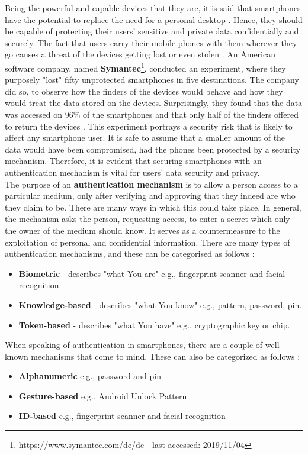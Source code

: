 Being the powerful and capable devices that they are, it is said that smartphones have the potential to replace the need for a personal desktop \cite{Alsaleh}. Hence, they should be capable of protecting their users' sensitive and private data confidentially and securely. The fact that users carry their mobile phones with them wherever they go causes a threat of the devices getting lost or even stolen \cite{Egelman:2014:YRL:2660267.2660273}. An American software company, named \textbf{Symantec}\footnote{https://www.symantec.com/de/de - last accessed: 2019/11/04}, conducted an experiment, where they purposely "lost" fifty unprotected smartphones in five destinations. The company did so, to observe how the finders of the devices would behave and how they would treat the data stored on the devices. Surprisingly, they found that the data was accessed on 96\% of the smartphones and that only half of the finders offered to return the devices \cite{symantec}.  This experiment portrays a security risk that is likely to affect any smartphone user.  It is safe to assume that a smaller amount of the data would have been compromised, had the phones been protected by a security mechanism. Therefore, it is evident that securing smartphones with an authentication mechanism is vital for users' data security and privacy.\\

The purpose of an \textbf{authentication mechanism} is to allow a person access to a particular medium, only after verifying and approving that they indeed are who they claim to be. There are many ways in which this could take place. In general, the mechanism asks the person, requesting access, to enter a secret which only the owner of the medium should know. It serves as a countermeasure to the exploitation of personal and confidential information. There are many types of authentication mechanisms, and these can be categorised as follows \cite{gorman}: 
\begin{itemize}
    \item \textbf{Biometric} - describes "what You are" e.g., fingerprint scanner and facial recognition.
    \item \textbf{Knowledge-based} - describes "what You know" e.g., pattern, password, pin.
    \item \textbf{Token-based} - describes "what You have" e.g., cryptographic key or chip.
\end{itemize}


When speaking of authentication in smartphones, there are a couple of well-known mechanisms that come to mind. These can also be categorized as follows \cite{ediss20251,gorman} : 
\begin{itemize}
    \item \textbf{Alphanumeric} e.g., password and pin
    \item \textbf{Gesture-based} e.g., Android Unlock Pattern
    \item \textbf{ID-based} e.g., fingerprint scanner and facial recognition 
\end{itemize}

